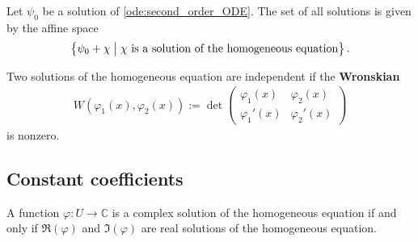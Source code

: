     \begin{property}
        Let $\psi_0$ be a solution of \cref{ode:second_order_ODE}. The set of all solutions is given by the affine space
        \begin{gather}
            \bigl\{\psi_0 + \chi\bigm\vert\chi\text{ is a solution of the homogeneous equation}\bigr\}\,.
        \end{gather}
    \end{property}
    \begin{property}[Wronskian]\label{ode:wronskian}
        Two solutions of the homogeneous equation are independent if the \textbf{Wronskian}
        \begin{gather}
            W\left(\varphi_1(x),\varphi_2(x)\right) := \det
            \begin{pmatrix}
                \varphi_1(x)&\varphi_2(x)\\
                \varphi_1'(x)&\varphi_2'(x)
            \end{pmatrix}
        \end{gather}
        is nonzero.
    \end{property}


\subsection{Constant coefficients}

    \begin{property}
        A function $\varphi:U\rightarrow\mathbb{C}$ is a complex solution of the homogeneous equation if and only if $\Re(\varphi)$ and $\Im(\varphi)$ are real solutions of the homogeneous equation.
    \end{property}


